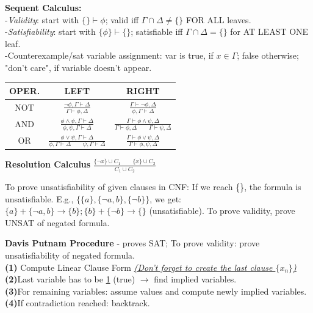 \documentclass{article}
\begin{document}
\begin{multicols}{4}
\textbf{Sequent Calculus:}\\
-\textit{Validity}: start with $\{\} \vdash {\phi}$;  valid iff $\Gamma \cap \Delta \neq \{\}$ FOR ALL leaves.\\
-\textit{Satisfiability}: start with $\{\phi\} \vdash \{\}$; satisfiable iff $\Gamma \cap \Delta = \{\}$ for AT LEAST ONE leaf.\\
-Counterexample/sat variable assignment: var is true, if $x \in \Gamma$; false otherwise; "don't care", if variable doesn't appear.\\
\begin{tabular}{|c|c|c|}
\hline
OPER. & LEFT & RIGHT \\ \hline
NOT & $\frac{\neg \phi,\Gamma \vdash \Delta}{\Gamma \vdash \phi, \Delta}$ & $\frac{\Gamma \vdash \neg \phi, \Delta}{\phi, \Gamma \vdash \Delta}$ \\ \hline
AND & $\frac{\phi \wedge \psi,\Gamma \vdash \Delta}{\phi, \psi,\Gamma \vdash \Delta}$ & $\frac{\Gamma \vdash \phi \wedge \psi, \Delta}{\Gamma \vdash \phi,\Delta \qquad \Gamma \vdash \psi,\Delta}$\\ \hline
OR & $\frac{\phi \vee \psi,\Gamma \vdash \Delta}{\phi,\Gamma \vdash \Delta \qquad \psi,\Gamma \vdash \Delta}$ & $\frac{\Gamma \vdash \phi \vee \psi, \Delta}{\Gamma \vdash \phi, \psi, \Delta}$ \\ \hline
\end{tabular}
\textbf{Resolution Calculus} $\frac{\{\neg x \} \cup C_1 \qquad \{x \} \cup C_2 }{C_1 \cup C_2}$

To prove unsatisfiability of given clauses in CNF: If we reach \{\}, the formula is unsatisfiable. 
E.g., $\{\{a\}, \{\neg a,b\}, \{\neg b\}\}$, we get: $\{a\} + \{ \neg a,b\} \rightarrow \{b\}; \{b\} + \{\neg b\}\rightarrow\{\} $ (unsatisfiable).
To prove validity, prove UNSAT of negated formula.

\textbf{Davis Putnam Procedure} - proves SAT; To prove validity: prove unsatisfiability of negated formula. \\
\textbf{(1)} Compute Linear Clause Form \underline{\textit{(Don't forget to create the last clause $\{x_n\}$)}} \\
\textbf{(2)}Last variable has to be \underline{1} (true) $\rightarrow$ find implied variables. \\
\textbf{(3)}For remaining variables: assume values and compute newly implied variables. \\
\textbf{(4)}If contradiction reached: backtrack.


\end{multicols}
\end{document}
